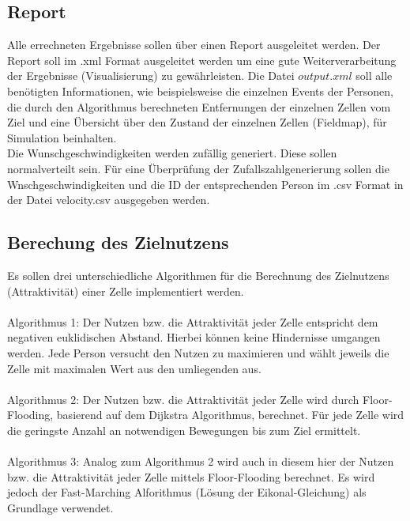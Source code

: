 \subsection{Report}
\label{Anforderungen:Report}
Alle errechneten Ergebnisse sollen über einen Report ausgeleitet werden.
Der Report soll im .xml Format ausgeleitet werden um eine gute Weiterverarbeitung der Ergebnisse (Visualisierung) zu gewährleisten. Die Datei $output.xml$ soll alle benötigten Informationen, wie beispielsweise die einzelnen Events der Personen, die durch den Algorithmus berechneten Entfernungen der einzelnen Zellen vom Ziel und eine Übersicht über den Zustand der einzelnen Zellen (Fieldmap), für Simulation beinhalten. \\
Die Wunschgeschwindigkeiten werden zufällig generiert. Diese sollen normalverteilt sein. Für eine Überprüfung der Zufallszahlgenerierung sollen die Wnschgeschwindigkeiten und die ID der entsprechenden Person im .csv Format in der Datei velocity.csv ausgegeben werden.

\subsection{Berechung des Zielnutzens}
\label{AnforderungenAlgorithmen}

Es sollen drei unterschiedliche Algorithmen für die Berechnung des Zielnutzens (Attraktivität) einer Zelle implementiert werden. \\
\\
Algorithmus 1: Der Nutzen bzw. die Attraktivität jeder Zelle entspricht dem negativen euklidischen Abstand. Hierbei können keine Hindernisse umgangen werden. Jede Person versucht den Nutzen zu maximieren und wählt jeweils die Zelle mit maximalen Wert aus den umliegenden aus.\\
\\
Algorithmus 2: Der Nutzen bzw. die Attraktivität jeder Zelle wird durch Floor-Flooding, basierend auf dem Dijkstra Algorithmus, berechnet. Für jede Zelle wird die geringste Anzahl an notwendigen Bewegungen bis zum Ziel ermittelt. \\
\\
Algorithmus 3: Analog zum Algorithmus 2 wird auch in diesem hier der Nutzen bzw. die Attraktivität jeder Zelle mittels Floor-Flooding berechnet. Es wird jedoch der Fast-Marching Alforithmus (Lösung der Eikonal-Gleichung) als Grundlage verwendet.

